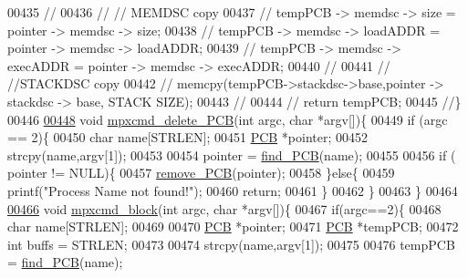 \begin{DoxyCode}
{00435 \textcolor{comment}{//              }
00436 \textcolor{comment}{//              // MEMDSC copy}
00437 \textcolor{comment}{//              tempPCB -> memdsc -> size = pointer -> memdsc -> size;}
00438 \textcolor{comment}{//              tempPCB -> memdsc -> loadADDR = pointer -> memdsc -> loadADDR;}
00439 \textcolor{comment}{//              tempPCB -> memdsc -> execADDR = pointer -> memdsc -> execADDR;}
00440 \textcolor{comment}{//              }
00441 \textcolor{comment}{//              //STACKDSC copy}
00442 \textcolor{comment}{//              memcpy(tempPCB->stackdsc->base,pointer -> stackdsc -> base, STACK
      SIZE);}
00443 \textcolor{comment}{//              }
00444 \textcolor{comment}{//      return tempPCB;}
00445 \textcolor{comment}{//\}}
00446 
\hypertarget{mpx__r2_8c_source_l00448}{}\hyperlink{mpx__r2_8h_ae6d6afa9fefa158029528a24841c453a}{00448} \textcolor{keywordtype}{void} \hyperlink{mpx__r2_8c_ae6d6afa9fefa158029528a24841c453a}{mpxcmd_delete_PCB}(\textcolor{keywordtype}{int} argc, \textcolor{keywordtype}{char} *argv[])\{
00449         \textcolor{keywordflow}{if} (argc == 2)\{
00450         \textcolor{keywordtype}{char} name[STRLEN];
00451         \hyperlink{structprocess}{PCB} *pointer;
00452         strcpy(name,argv[1]);
00453         
00454         pointer = \hyperlink{mpx__r2_8c_a612a6abcb66c688a32f33abc93ff3990}{find_PCB}(name);
00455         
00456         \textcolor{keywordflow}{if} ( pointer != NULL)\{
00457                 \hyperlink{mpx__r2_8c_af30a3658210d449b4b53e5be2ed2bc2e}{remove_PCB}(pointer);
00458         \}\textcolor{keywordflow}{else}\{
00459                 printf(\textcolor{stringliteral}{"Process Name not found!"});
00460                 \textcolor{keywordflow}{return};
00461         \}
00462         \}
00463 \}
00464 
\hypertarget{mpx__r2_8c_source_l00466}{}\hyperlink{mpx__r2_8h_ae8eb72663ecff92c27ab06e3560fd0d4}{00466} \textcolor{keywordtype}{void} \hyperlink{mpx__r2_8c_ae8eb72663ecff92c27ab06e3560fd0d4}{mpxcmd_block}(\textcolor{keywordtype}{int} argc, \textcolor{keywordtype}{char} *argv[])\{
00467         \textcolor{keywordflow}{if}(argc==2)\{
00468                 \textcolor{keywordtype}{char} name[STRLEN];
00469                 
00470                 \hyperlink{structprocess}{PCB} *pointer;
00471                 \hyperlink{structprocess}{PCB} *tempPCB;
00472                 \textcolor{keywordtype}{int} buffs = STRLEN;
00473                 
00474                 strcpy(name,argv[1]);
00475                 
00476                 tempPCB = \hyperlink{mpx__r2_8c_a612a6abcb66c688a32f33abc93ff3990}{find_PCB}(name);
}
\end{DoxyCode}
